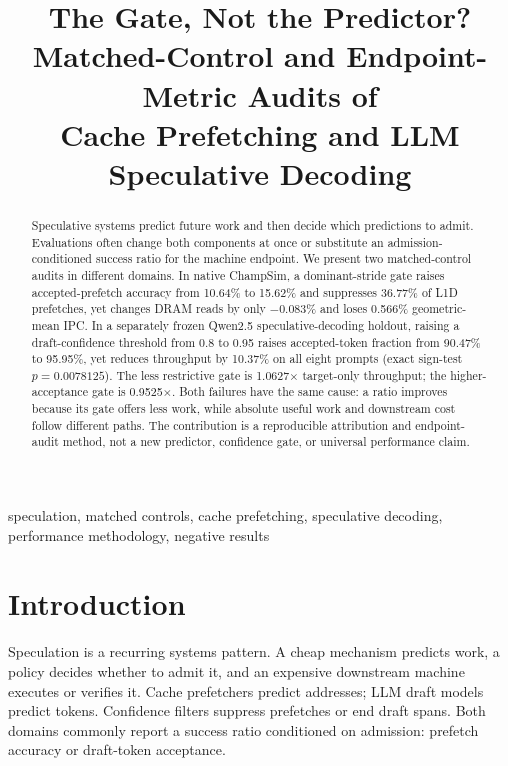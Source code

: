 \documentclass[conference]{IEEEtran}
\begin{document}
\title{The Gate, Not the Predictor?\\
Matched-Control and Endpoint-Metric Audits of\\
Cache Prefetching and LLM Speculative Decoding}
\author{
}
\maketitle

\begin{abstract}
Speculative systems predict future work and then decide which predictions to
admit. Evaluations often change both components at once or substitute an
admission-conditioned success ratio for the machine endpoint. We present two
matched-control audits in different domains. In native ChampSim, a
dominant-stride gate raises accepted-prefetch accuracy from 10.64\% to 15.62\%
and suppresses 36.77\% of L1D prefetches, yet changes DRAM reads by only
$-0.083\%$ and loses 0.566\% geometric-mean IPC. In a separately frozen
Qwen2.5 speculative-decoding holdout, raising a draft-confidence threshold
from 0.8 to 0.95 raises accepted-token fraction from 90.47\% to 95.95\%, yet
reduces throughput by 10.37\% on all eight prompts (exact sign-test
$p=0.0078125$). The less restrictive gate is 1.0627$\times$ target-only
throughput; the higher-acceptance gate is 0.9525$\times$. Both failures have
the same cause: a ratio improves because its gate offers less work, while
absolute useful work and downstream cost follow different paths. The
contribution is a reproducible attribution and endpoint-audit method, not a
new predictor, confidence gate, or universal performance claim.
\end{abstract}

\begin{IEEEkeywords}
speculation, matched controls, cache prefetching, speculative decoding,
performance methodology, negative results
\end{IEEEkeywords}

\section{Introduction}
Speculation is a recurring systems pattern. A cheap mechanism predicts work,
a policy decides whether to admit it, and an expensive downstream machine
executes or verifies it. Cache prefetchers predict addresses; LLM draft models
predict tokens. Confidence filters suppress prefetches or end draft spans.
Both domains commonly report a success ratio conditioned on admission:
prefetch accuracy or draft-token acceptance.
\end{document}
